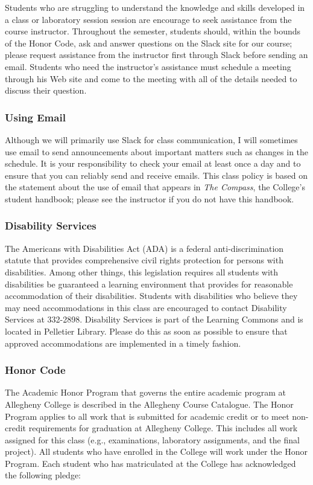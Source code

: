 Students who are struggling to understand the knowledge and skills developed in a class or laboratory session session
are encourage to seek assistance from the course instructor. Throughout the semester, students should, within the bounds
of the Honor Code, ask and answer questions on the Slack site for our course; please request assistance from the
instructor first through Slack before sending an email. Students who need the instructor's assistance must
schedule a meeting through his Web site and come to the meeting with all of the details needed to discuss their
question.

\subsubsection*{Using Email}

Although we will primarily use Slack for class communication, I will sometimes use email to send announcements about
important matters such as changes in the schedule. It is your responsibility to check your email at least once a day and to
ensure that you can reliably send and receive emails. This class policy is based on the statement about the use of email that
appears in {\em The Compass}, the College's student handbook; please see the instructor if you do not have this
handbook.

\subsubsection*{Disability Services}

The Americans with Disabilities Act (ADA) is a federal anti-discrimination statute that provides comprehensive civil
rights protection for persons with disabilities.  Among other things, this legislation requires all students with
disabilities be guaranteed a learning environment that provides for reasonable accommodation of their disabilities.
Students with disabilities who believe they may need accommodations in this class are encouraged to contact Disability
Services at 332-2898.  Disability Services is part of the Learning Commons and is located in Pelletier Library.
Please do this as soon as possible to ensure that approved accommodations are implemented in a timely fashion.

\subsubsection*{Honor Code}

The Academic Honor Program that governs the entire academic program at Allegheny College is described in the Allegheny
Course Catalogue.  The Honor Program applies to all work that is submitted for academic credit or to meet non-credit
requirements for graduation at Allegheny College.  This includes all work assigned for this class (e.g., examinations,
laboratory assignments, and the final project).  All students who have enrolled in the College will work under the Honor
Program.  Each student who has matriculated at the College has acknowledged the following pledge:

